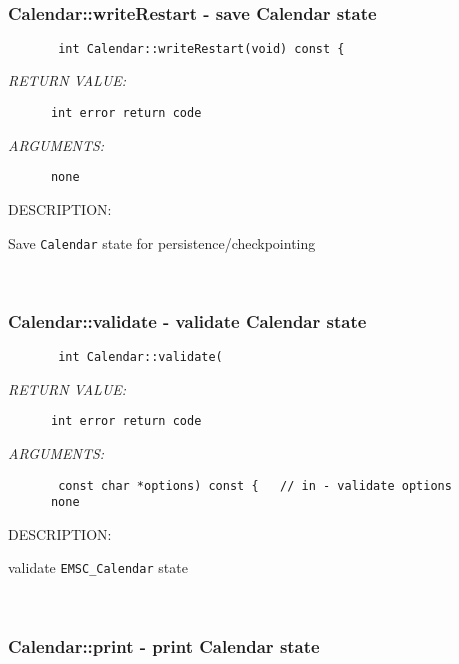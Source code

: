  
\mbox{}\hrulefill\ 
 
\subsubsection [Calendar::writeRestart] {Calendar::writeRestart - save Calendar state}


  
\begin{verbatim}       int Calendar::writeRestart(void) const {\end{verbatim}{\em RETURN VALUE:}
\begin{verbatim}      int error return code\end{verbatim}{\em ARGUMENTS:}
\begin{verbatim}      none\end{verbatim}
{\sf DESCRIPTION:\\ }


        Save {\tt Calendar} state for persistence/checkpointing
   
 
\mbox{}\hrulefill\ 
 
\subsubsection [Calendar::validate] {Calendar::validate - validate Calendar state}


  
\begin{verbatim}       int Calendar::validate(\end{verbatim}{\em RETURN VALUE:}
\begin{verbatim}      int error return code\end{verbatim}{\em ARGUMENTS:}
\begin{verbatim}       const char *options) const {   // in - validate options
      none\end{verbatim}
{\sf DESCRIPTION:\\ }


        validate {\tt EMSC\_Calendar} state
   
 
\mbox{}\hrulefill\ 
 
\subsubsection [Calendar::print] {Calendar::print - print Calendar state}


